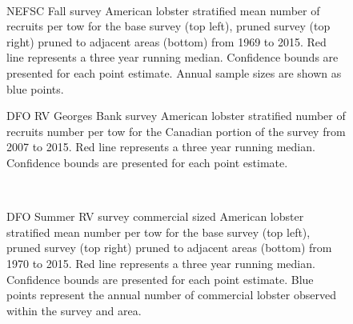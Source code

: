 \documentclass[11pt]{article}
\newcommand{\e}{/backup/bio_data/bio.lobster/figures/} %
\begin{document}
\begin{figure}
\centering
{}\\

\caption{NEFSC Fall survey American lobster stratified mean number of recruits per tow for the base survey (top left), pruned survey (top right) pruned to adjacent areas (bottom) from 1969 to 2015. Red line represents a three year running median. Confidence bounds are presented for each point estimate. Annual sample sizes are shown as blue points. }
\end{figure}
\clearpage


\begin{figure}

    \caption{DFO RV Georges Bank survey American lobster stratified number of recruits number per tow for the Canadian portion of the survey from 2007 to 2015. Red line represents a three year running median. Confidence bounds are presented for each point estimate.}

\end{figure}



\begin{figure}
\centering
{}\\
\caption{DFO Summer RV survey commercial sized American lobster stratified mean number per tow for the base survey (top left), pruned survey (top right) pruned to adjacent areas (bottom) from 1970 to 2015. Red line represents a three year running median. Confidence bounds are presented for each point estimate. Blue points represent the annual number of commercial lobster observed within the survey and area.}
\end{figure}
\clearpage
\end{document}

